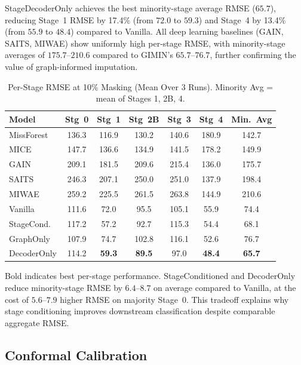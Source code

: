 StageDecoderOnly achieves the best minority-stage average RMSE ($65.7$), reducing Stage~1 RMSE by 17.4\% (from $72.0$ to $59.3$) and Stage~4 by 13.4\% (from $55.9$ to $48.4$) compared to Vanilla. All deep learning baselines (GAIN, SAITS, MIWAE) show uniformly high per-stage RMSE, with minority-stage averages of $175.7$--$210.6$ compared to GIMIN's $65.7$--$76.7$, further confirming the value of graph-informed imputation.

\begin{table}[!t]
\caption{Per-Stage RMSE at 10\% Masking (Mean Over 3 Runs). Minority Avg = mean of Stages 1, 2B, 4.}
\label{p2:tab:per_stage}
\centering
\footnotesize
\setlength{\tabcolsep}{2.5pt}
\begin{tabular}{@{}lcccccc@{}}
\toprule
\textbf{Model} & \textbf{Stg~0} & \textbf{Stg~1} & \textbf{Stg~2B} & \textbf{Stg~3} & \textbf{Stg~4} & \textbf{Min.~Avg} \\
\midrule
MissForest & 136.3 & 116.9 & 130.2 & 140.6 & 180.9 & 142.7 \\
MICE & 147.7 & 136.6 & 134.9 & 141.5 & 178.2 & 149.9 \\
GAIN & 209.1 & 181.5 & 209.6 & 215.4 & 136.0 & 175.7 \\
SAITS & 246.3 & 207.1 & 250.0 & 251.0 & 137.9 & 198.4 \\
MIWAE & 259.2 & 225.5 & 261.5 & 263.8 & 144.9 & 210.6 \\
\midrule
Vanilla & 111.6 & 72.0 & 95.5 & 105.1 & 55.9 & 74.4 \\
StageCond. & 117.2 & 57.2 & 92.7 & 115.3 & 54.4 & 68.1 \\
GraphOnly & 107.9 & 74.7 & 102.8 & 116.1 & 52.6 & 76.7 \\
DecoderOnly & 114.2 & \textbf{59.3} & \textbf{89.5} & 97.0 & \textbf{48.4} & \textbf{65.7} \\
\bottomrule
\end{tabular}
\vspace{2pt}
\parbox{\columnwidth}{\scriptsize Bold indicates best per-stage performance. StageConditioned and DecoderOnly reduce minority-stage RMSE by $6.4$--$8.7$ on average compared to Vanilla, at the cost of $5.6$--$7.9$ higher RMSE on majority Stage~0. This tradeoff explains why stage conditioning improves downstream classification despite comparable aggregate RMSE.}
\end{table}

\subsection{Conformal Calibration}

